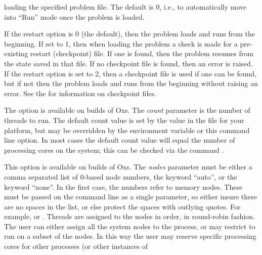 \begin{description}
  loading the specified problem file.  The default is 0, i.e., to
  automatically move into ``Run'' mode once the problem is loaded.
\item[\optkey{-restart \boa 0\pipe 1\pipe 2\bca}]
  If the restart option is 0 (the default), then the problem loads and
  runs from the beginning.  If set to 1, then when loading the problem a
  check is made for a pre-existing restart (checkpoint) file.  If one is
  found, then the problem resumes from the state saved in that file.  If
  no checkpoint file is found, then an error is raised.  If the restart
  option is set to 2, then a checkpoint file is used if one can be
  found, but if not then the problem loads and runs from the beginning
  without raising an error.  See the
   for
  information on checkpoint files.
\item[\optkey{-threads \boa count\bca}]
  The option is available on
   builds of Oxs.
  The \textit{count} parameter is the number of threads to run.  The
  default count value is set by the  value in
  the  file for your platform, but may be
  overridden by the
  environment variable or this
  command line option.  In most cases the default count value will
  equal the number of processing cores on the system; this can be
  checked via the command .
\item[\optkey{-numanodes \boa nodes\bca}]
  This option is available on
   builds of
  Oxs.  The \textit{nodes} parameter must be either a comma separated
  list of 0-based node numbers, the keyword ``auto'', or the keyword
  ``none''.  In the first case, the numbers refer to memory nodes.
  These must be passed on the command line as a single parameter, so
  either insure there are no spaces in the list, or else protect the
  spaces with outlying quotes.  For example,  or
  .  Threads are assigned to the nodes in
  order, in round-robin fashion.  The user can either assign all the
  system nodes to the  process, or may restrict 
  to run on a subset of the nodes.  In this way the user may reserve
  specific processing cores for other processes (or other instances of

\end{description}
